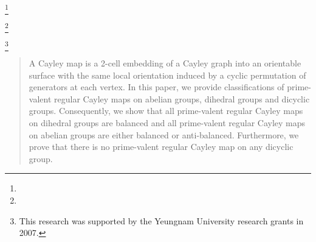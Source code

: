 \documentclass[12pt]{amsart}
\begin{document}
\baselineskip 16pt


\newtheorem{theorem}{Theorem}[section]
\newtheorem{problem}{Problem}
\newtheorem{defin}{Definition}
\newtheorem{lemma}[theorem]{Lemma}
\newtheorem{prop}[theorem]{Proposition}
\newtheorem{conj}{Conjecture}
\newtheorem{op}{Open Problem}
\newtheorem{example}{Example}
\newtheorem{note}{Note}
\newtheorem{remark}{Remark}
\newtheorem{corollary}[theorem]{Corollary}
\newenvironment{pfA}{\medskip\noindent{\bf{Proof of Theorem 1.1:}}
  \hspace{-.4cm}      \enspace}{\hfill \qed \newline \smallskip}
  \newenvironment{pfB}{\medskip\noindent{\bf{Proof of Theorem 1.2:}}
  \hspace{-.4cm}      \enspace}{\hfill \qed \newline \smallskip}
  \newenvironment{pfC}{\medskip\noindent{\bf{Proof of Theorem 1.3:}}
  \hspace{-.4cm}      \enspace}{\hfill \qed \newline \smallskip}

\setlength{\unitlength}{12pt}

\author{Dongseok Kim}
\address{Department of Mathematics \\ Kyungpook National University \\ Taegu, 702-201 Korea}
\thanks{}

\author{Young Soo Kwon}
\address{Department of Mathematics \\Yeungnam University \\Kyongsan, 712-749, Korea}
\thanks{}

\author{Jaeun Lee}
\address{Department of Mathematics \\Yeungnam University \\Kyongsan, 712-749, Korea}
\thanks{This research was supported by the Yeungnam University research grants in 2007.}


\begin{abstract}
A Cayley map is a 2-cell embedding of a Cayley graph into an
orientable surface with the same local orientation induced by a
cyclic permutation of generators at each vertex. In this paper, we
provide classifications of prime-valent regular Cayley maps on
abelian groups, dihedral groups and dicyclic groups. Consequently,
we show that all prime-valent regular Cayley maps on dihedral
groups are balanced and all prime-valent regular Cayley maps on
abelian groups are either balanced or anti-balanced. Furthermore,
we prove that there is no prime-valent regular Cayley map
on any dicyclic group.
\end{abstract}
\end{document}

